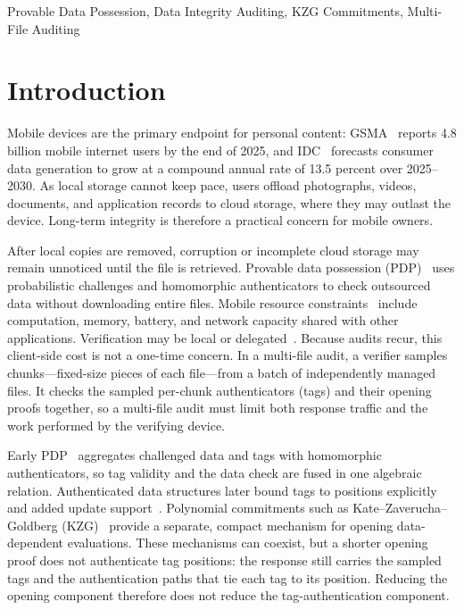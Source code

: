 \documentclass[lettersize,journal]{IEEEtran}
\begin{document}
\begin{IEEEkeywords}
Provable Data Possession, Data Integrity Auditing, KZG Commitments, Multi-File Auditing
\end{IEEEkeywords}

\section{Introduction}

Mobile devices are the primary endpoint for personal content: GSMA~\cite{GSMA2026Connectivity} reports 4.8 billion mobile internet users by the end of 2025, and IDC~\cite{IDC2026DataSphere} forecasts consumer data generation to grow at a compound annual rate of 13.5 percent over 2025--2030. As local storage cannot keep pace, users offload photographs, videos, documents, and application records to cloud storage, where they may outlast the device. Long-term integrity is therefore a practical concern for mobile owners.

After local copies are removed, corruption or incomplete cloud storage may remain unnoticed until the file is retrieved. Provable data possession (PDP)~\cite{Ateniese2007PDP} uses probabilistic challenges and homomorphic authenticators to check outsourced data without downloading entire files. Mobile resource constraints~\cite{Dinh2013MCC} include computation, memory, battery, and network capacity shared with other applications. Verification may be local or delegated~\cite{Li2015OPoR,Yu2022Offline}. Because audits recur, this client-side cost is not a one-time concern. In a multi-file audit, a verifier samples chunks---fixed-size pieces of each file---from a batch of independently managed files. It checks the sampled per-chunk authenticators (tags) and their opening proofs together, so a multi-file audit must limit both response traffic and the work performed by the verifying device.

Early PDP~\cite{Ateniese2007PDP,Ateniese2008Scalable} aggregates challenged data and tags with homomorphic authenticators, so tag validity and the data check are fused in one algebraic relation. Authenticated data structures later bound tags to positions explicitly and added update support~\cite{Erway2009DPDP,Wang2011TPDS}. Polynomial commitments such as Kate--Zaverucha--Goldberg (KZG)~\cite{Kate2010KZG} provide a separate, compact mechanism for opening data-dependent evaluations. These mechanisms can coexist, but a shorter opening proof does not authenticate tag positions: the response still carries the sampled tags and the authentication paths that tie each tag to its position. Reducing the opening component therefore does not reduce the tag-authentication component.
\end{document}
